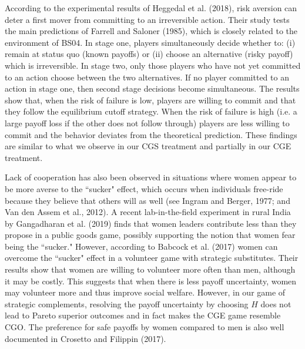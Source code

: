 \documentclass[12pt, letterpaper]{article}
\theoremstyle{plain}
\begin{document}
According to the experimental results of Heggedal et al. (2018), risk aversion can deter a first mover from committing to an irreversible action. Their study tests the main predictions of Farrell and Saloner (1985), which is closely related to the environment of BS04. In stage one, players simultaneously decide whether to: (i) remain at status quo (known payoffs) or (ii) choose an alternative (risky payoff) which is irreversible. In stage two, only those players who have not yet committed to an action choose between the two alternatives. If no player committed to an action in stage one, then second stage decisions become simultaneous. The results show that, when the risk of failure is low, players are willing to commit and that they follow the equilibrium cutoff strategy. When the risk of failure is high (i.e. a large payoff loss if the other does not follow through) players are less willing to commit and the behavior deviates from the theoretical prediction. These findings are similar to what we observe in our CGS treatment and partially in our CGE treatment.

Lack of cooperation has also been observed in situations where women appear to be more averse to the ``sucker" effect, which occurs when individuals free-ride because they believe that others will as well (see Ingram and Berger, 1977; and Van den Assem et al., 2012). A recent lab-in-the-field experiment in rural India by Gangadharan et al. (2019) finds that women leaders contribute less than they propose in a public goods game, possibly supporting the notion that women fear being the ``sucker." However, according to Babcock et al. (2017) women can overcome the ``sucker" effect in a volunteer game with strategic substitutes. Their results show that women are willing to volunteer more often than men, although it may be costly. This suggests that when there is less payoff uncertainty, women may volunteer more and thus improve social welfare. However, in our game of strategic complements, resolving the payoff uncertainty by choosing $H$ does not lead to Pareto superior outcomes and in fact makes the CGE game resemble CGO. The preference for safe payoffs by women compared to men is also well documented in Crosetto and Filippin (2017).
\end{document}
